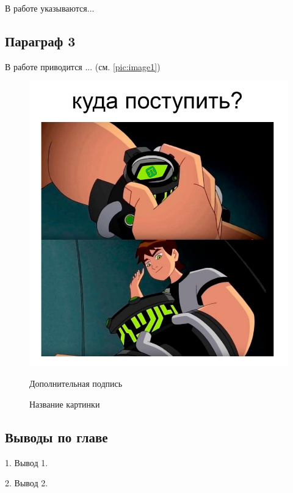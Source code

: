 \documentclass[../main.tex]{subfiles}
\begin{document}
В работе \cite{KIVITS2023} указываются...

\subsection{Параграф 3}	

В работе \cite{Elfimova-verifInfNap} приводится ... (см. \piclabel \ref{pic:image1})


 \begin{figure}[H]
 	\begin{center}
 		\includegraphics[width=0.99\linewidth]{images/image1.jpg}
 		\captionsetup{justification=centering}
 		\caption*{Дополнительная подпись}
 		\vspace{2em}
 		\caption{Название картинки \cite{ГОСТ_58439-2}} 
 		\label{pic:GOST-scheme}		
 	\end{center}
 \end{figure}
 




\subsection{Выводы по главе}

1. Вывод 1.

2. Вывод 2.
\end{document}
